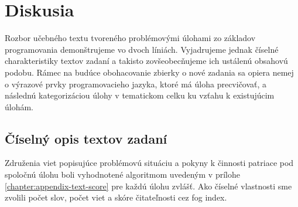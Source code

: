 \section{Diskusia}
Rozbor učebného textu tvoreného problémovými úlohami zo základov programovania demonštrujeme vo dvoch líniách. Vyjadrujeme jednak číselné charakteristiky textov zadaní a takisto zovšeobecňujeme ich ustálenú obsahovú podobu. Rámec na budúce obohacovanie zbierky o nové zadania sa opiera nemej o výrazové prvky programovacieho jazyka, ktoré má úloha precvičovať, a následnú kategorizáciou úlohy v tematickom celku ku vzťahu k existujúcim úlohám.

\subsection{Číselný opis textov zadaní}
Združenia viet popisujúce problémovú situáciu a pokyny k činnosti patriace pod spoločnú úlohu boli vyhodnotené algoritmom uvedeným v prílohe \ref{chapter:appendix-text-score} pre každú úlohu zvlášť. Ako číselné vlastnosti sme zvolili počet slov, počet viet a skóre čitateľnosti cez fog index.

